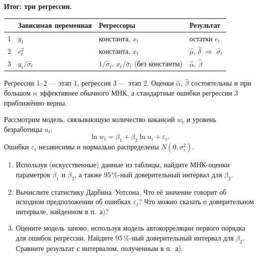 \begin{solution}
\medskip
\textbf{Итог: три регрессии.}
\begin{center}
\small
\begin{tabular}{@{}clll@{}}
\toprule
 & Зависимая переменная & Регрессоры & Результат \\
\midrule
1 & $y_t$ & константа, $x_t$ & остатки $e_t$ \\
2 & $e_t^2$ & константа, $x_t$ & $\widehat\mu$, $\widehat\delta$ $\Rightarrow$ $\widehat\sigma_t$ \\
3 & $y_t/\widehat\sigma_t$ & $1/\widehat\sigma_t$, $x_t/\widehat\sigma_t$ (без константы) & $\widehat\alpha$, $\widehat\beta$ \\
\bottomrule
\end{tabular}
\end{center}
Регрессии 1--2 — этап 1, регрессия 3 — этап 2. Оценки $\widehat\alpha$,
$\widehat\beta$ состоятельны и при большом $n$ эффективнее обычного МНК, а
стандартные ошибки регрессии 3 приближённо верны.
\end{solution}

\ifsolutions\clearpage\fi
{}

Рассмотрим модель, связывающую количество вакансий $w_t$ и уровень
безработицы $u_t$:
\[
  \ln w_t = \beta_1 + \beta_2\ln u_t + \varepsilon_t .
\]
Ошибки $\varepsilon_t$ независимы и нормально распределены
$N(0, \sigma_{\varepsilon}^2)$.
\begin{enumerate}[label=\asbuk*), leftmargin=2.2em, itemsep=3pt]
  \item Используя (искусственные) данные из таблицы, найдите МНК-оценки
        параметров $\beta_1$ и $\beta_2$, а также 95\,\%-ный доверительный
        интервал для $\beta_2$.
  \item Вычислите статистику Дарбина--Уотсона. Что её значение говорит об
        исходном предположении об ошибках $\varepsilon_t$? Что можно сказать
        о доверительном интервале, найденном в п.~а)?
  \item Оцените модель заново, используя модель автокорреляции первого
        порядка для ошибок регрессии. Найдите 95\,\%-ный доверительный
        интервал для $\beta_2$. Сравните результат с интервалом, полученным в
        п.~а).
\end{enumerate}

